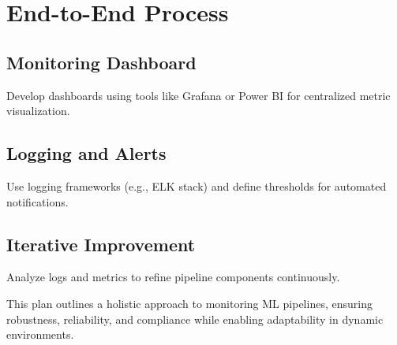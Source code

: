 \section{End-to-End Process}
\subsection{Monitoring Dashboard}
Develop dashboards using tools like Grafana or Power BI for centralized metric visualization.

\subsection{Logging and Alerts}
Use logging frameworks (e.g., ELK stack) and define thresholds for automated notifications.

\subsection{Iterative Improvement}
Analyze logs and metrics to refine pipeline components continuously.

This plan outlines a holistic approach to monitoring ML pipelines, ensuring robustness, reliability, and compliance while enabling adaptability in dynamic environments.
